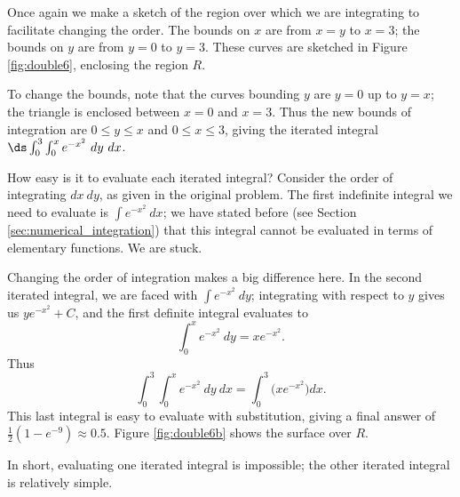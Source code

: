 {Once again we make a sketch of the region over which we are integrating to facilitate changing the order. The bounds on $x$ are from $x=y$ to $x=3$; the bounds on $y$ are from $y=0$ to $y=3$. These curves are sketched in Figure \ref{fig:double6}, enclosing the region $R$.


To change the bounds, note that the curves bounding $y$ are $y=0$ up to $y=x$; the triangle is enclosed between $x=0$ and $x=3$. Thus the new bounds of integration are $0\leq y\leq x$ and $0\leq x\leq 3$, giving the iterated integral $\ds \int_0^3\int_0^x e^{-x^2}\ dy\ dx$.

How easy is it to evaluate each iterated integral? Consider the order of integrating $dx\ dy$, as given in the original problem. The first indefinite integral we need to evaluate is $\int e^{-x^2}\ dx$; we have stated before (see Section \ref{sec:numerical_integration}) that this integral cannot be evaluated in terms of elementary functions. We are stuck.

Changing the order of integration makes a big difference here. In the second iterated integral, we are faced with $\int e^{-x^2}\ dy$; integrating with respect to $y$ gives us $ye^{-x^2}+C$, and the first definite integral evaluates to 
$$\int_0^x e^{-x^2}\ dy = xe^{-x^2}.$$
Thus 
$$\int_0^3\int_0^x e^{-x^2}\ dy\ dx = \int_0^3\Big(xe^{-x^2}\Big)dx.$$
This last integral is easy to evaluate with substitution, giving a final answer of $\frac12(1-e^{-9})\approx 0.5$. Figure \ref{fig:double6b} shows the surface over $R$.
 

In short, evaluating one iterated integral is impossible; the other iterated integral is relatively simple.
}\\

